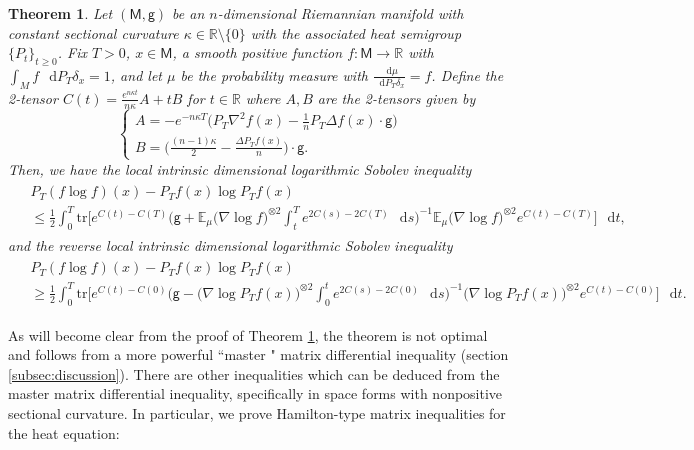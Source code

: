 \documentclass[a4paper,twoside,11pt,reqno]{amsart}
\newtheorem{theorem}{Theorem}
\newcommand*\diff{\mathop{}\!\mathrm{d}}
\newcommand{\R}{\mathbb{R}} %
\newcommand{\MM}{\mathsf{M}}
\newcommand{\GG}{\mathsf{g}}
\newcommand{\mb}{\mathbb}
\newcommand{\mr}{\mathrm}
\begin{document}
\begin{theorem} \label{thm:manifolds}
Let $(\MM,\GG)$ be an $n$-dimensional Riemannian manifold with constant sectional curvature $\kappa\in\R\setminus\{0\}$ with the associated  heat semigroup $\{P_t\}_{t\ge 0}$. Fix $T>0$, $x\in\MM$, a smooth positive function $f:\MM\to\R$ with $\int_M f\,\diff P_T\delta_x=1$, and let $\mu$ be the probability measure with $\frac{\diff\mu}{\diff P_T\delta_x}=f$. Define the 2-tensor $C(t) = \frac{e^{n\kappa t}}{n\kappa}A+tB$ for $t\in\R$ where $A, B$ are the 2-tensors given by
\begin{equation}
\begin{cases}
A =- e^{-n\kappa T}  \big(P_T\nabla^2 f(x) - \frac{1}{n} P_T \Delta f(x)\cdot \GG\big) \\ B = \Big(\frac{(n-1)\kappa}{2} - \frac{\Delta P_T f(x)}{n}\Big) \cdot \GG.
\end{cases}
\end{equation}
Then, we have the local intrinsic dimensional logarithmic Sobolev inequality
\begin{align} \label{eq:manifolds-lsi}
\begin{split}
&P_T(f\log f)(x)-P_Tf(x)\log P_Tf(x)\\
& \leq \frac{1}{2} \int_0^T\!\!\!  \mr{tr}\Big[e^{C(t)-C(T)} \Big(\GG + \mb{E}_\mu \big(\nabla \log f\big)^{\otimes 2}\!\! \int_t^T e^{2C(s)-2C(T)} \,\diff s \Big)^{-1}\!\! \mb{E}_\mu \big(\nabla \log f\big)^{\otimes 2}  e^{C(t)-C(T)}\Big]\,\diff t,
\end{split}
\end{align}
and the reverse local intrinsic dimensional logarithmic Sobolev inequality
\begin{align} \label{eq:manifolds-rev-lsi}
\begin{split}
&P_T(f\log f)(x)-P_Tf(x)\log P_Tf(x)\\
& \geq \frac{1}{2} \int_0^T \mr{tr}\Big[e^{C(t)-C(0)} \Big( \GG -\big( \nabla \log P_Tf(x)\big)^{\otimes 2} \int_0^t e^{2C(s)-2C(0)}\,\diff s\Big)^{-1} \big( \nabla \log P_Tf(x)\big)^{\otimes 2} e^{C(t)-C(0)}\Big] \,\diff t.
\end{split}
\end{align}
\end{theorem}
As will become clear from the proof of Theorem \ref{thm:manifolds}, the theorem is not optimal and follows from a more powerful ``master " matrix differential inequality (section \ref{subsec:discussion}). There are other inequalities which can be deduced from the master matrix differential inequality, specifically in space forms with nonpositive sectional curvature. In particular, we prove Hamilton-type matrix inequalities for the heat equation:
\end{document}
